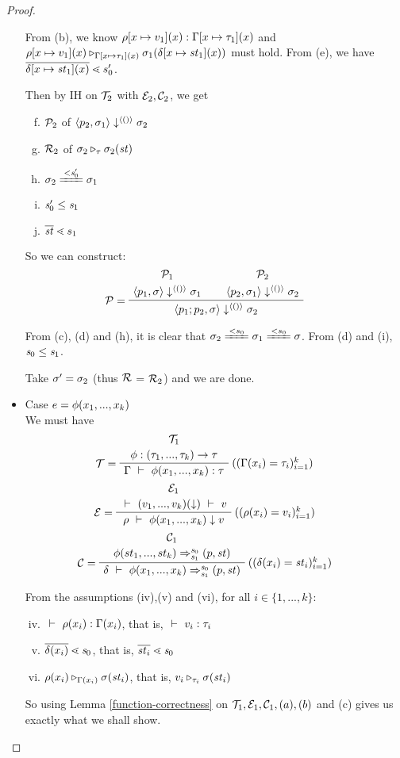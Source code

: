 \begin{proof}
\begin{itemize}
  From (b), we know $\rho[x \mapsto v_1](x) : \Gamma[x \mapsto \tau_1](x)$ and  $\rho[x \mapsto v_1](x) \triangleright_{\Gamma[x \mapsto \tau_1](x)} \sigma_1(\delta[x \mapsto \mathit{st}_1](x))$ must hold. 
  From (e), we have $\ol{\delta[\Map{x}{\st_1}](x)} \.< s_0'$. 
 
 Then by IH on  $\mathcal{T}_2$ with $\mathcal{E}_2,\mathcal{C}_2$, we get
 \begin{enumerate}	[(a)]
 	\setcounter{enumi}{5}
 	\item $\mathcal{P}_2$ of $\left\langle p_2,\sigma_1 \right\rangle \downarrow^{\langle () \rangle} \sigma_2$ 
 	\item $\mathcal{R}_2$ of $ \sigma_2 \triangleright_{\tau} \sigma_2(\mathit{st})$
    \item $\sgm_2 \ConEq{\s_0'} \sgm_1$
    \item $\mathit{s}_0' \le \mathit{s}_1$
    \item $\ol{\st} \.< {s_1}$
\end{enumerate}

 So we can construct:  
 $$\PT{
 	\UCN{\MP_1}{\seval{p_1}{\sgm}{\vunit}{\sgm_1}}
 	\UCN{\MP_2}{\seval{p_2}{\sgm_1}{\vunit}{\sgm_2}}
 	\LeLa{\MP = }	
 	\BC{\seval{p_1;p_2}{\sgm}{\vunit}{\sgm_2}}
 }$$

 From (c), (d) and (h), it is clear that $\sgm_2 \ConEq{s_0} \sgm_1 \ConEq{s_0} \sgm$.
 From (d) and (i), $\mathit{s}_0 \le \mathit{s}_1$.
 
 Take $\sigma' = \sigma_2$ (thus $\mathcal{R}$ = $\mathcal{R}_2$)  and we are done. 
 
 
 \item Case $e = \phi(x_1,...,x_k)$ \\
 We must have  
 $$\PT{
 	\UCN{\MT_1}{\Typef {\hcall} {\replc{k}{\tau}} {\tau}}
 	\LeLa{\MT = }
 	\RiLa{((\Gam(x_i)= \tau_i)^k_{i=1})}
 	\UC{\Type{\Gam}{\hcall{\Tupk{x}}}{\tau}}
 }$$
 $$\PT{
 	\UCN{\ME_1}{\Eval{}{\EvalF{\Tupk{v}}}{v}}
 	\LeLa{\ME = }
 	\RiLa{((\rho(x_i)=v_i)^k_{i=1})}
 	\UC{\Eval{\rho}{\hcall{\Tupk{x}}}{v}}
 }$$
 $$\PT{
 	\UCN{\MC_1}{\Transf{\hcall}{\replc{k}{st}}{\s_0}{\s_1}{\sfun{p}{\st}}}
    \LeLa{\MC =}
 	\RiLa{((\del(x_i)=\st_i)^k_{i=1})}
 	\UC{\Trans{\del}{\hcall \Tupk{x}}{\s_0}{\s_1}{\sfun{p}{\st}}}
 }$$
 
 From the assumptions (iv),(v) and (vi), for all $i \in \{1,...,k\}$:
 \begin{enumerate}[(i)]
 	\setcounter{enumi}{3}
 	\item $\ \vdash\  \rho(x_i) : \Gamma(x_i)$, that is, $\ \vdash\  v_i : \tau_i$
 	\item $\ol{\del(x_i)} \.< \s_0$, that is, $\ol{\st_i} \.< \s_0$
 	\item $\rho(x_i) \triangleright_{\Gamma(x_i)} \sigma(\mathit{st}_i)$, that is,
 	$v_i \triangleright_{\tau_i} \sigma(\mathit{st}_i)$
 \end{enumerate}
 
 So using Lemma \ref{function-correctness} on $\mathcal{T}_1,\mathcal{E}_1, \mathcal{C}_1, (a),(b)$ and (c) gives us exactly what we shall show.
 	
	\end{itemize}	
\end{proof}


